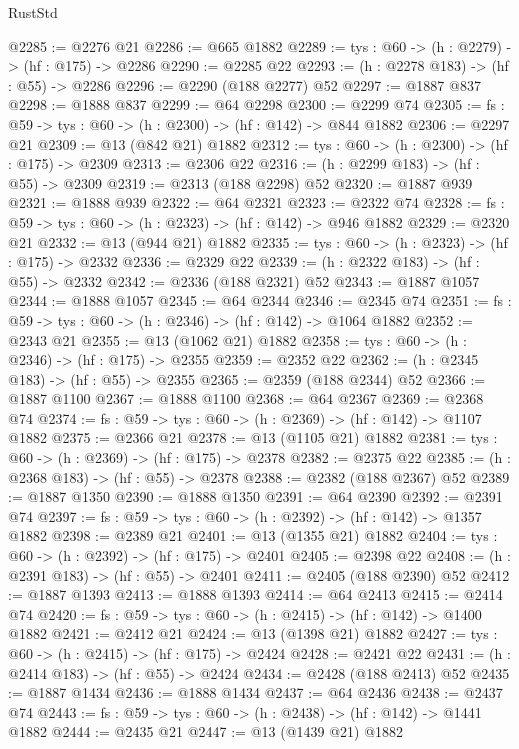 \begin{lexlean}{RustStd}
\begin{coremodule}
@2285 := @2276 @21
@2286 := @665 @1882
@2289 := {tys : @60} -> (h : @2279) -> (hf : @175) -> @2286
@2290 := @2285 @22
@2293 := (h : @2278 @183) -> (hf : @55) -> @2286
@2296 := @2290 (@188 @2277) @52
@2297 := @1887 @837
@2298 := @1888 @837
@2299 := @64 @2298
@2300 := @2299 @74
@2305 := {fs : @59} -> {tys : @60} -> (h : @2300) -> (hf : @142) -> @844 @1882
@2306 := @2297 @21
@2309 := @13 (@842 @21) @1882
@2312 := {tys : @60} -> (h : @2300) -> (hf : @175) -> @2309
@2313 := @2306 @22
@2316 := (h : @2299 @183) -> (hf : @55) -> @2309
@2319 := @2313 (@188 @2298) @52
@2320 := @1887 @939
@2321 := @1888 @939
@2322 := @64 @2321
@2323 := @2322 @74
@2328 := {fs : @59} -> {tys : @60} -> (h : @2323) -> (hf : @142) -> @946 @1882
@2329 := @2320 @21
@2332 := @13 (@944 @21) @1882
@2335 := {tys : @60} -> (h : @2323) -> (hf : @175) -> @2332
@2336 := @2329 @22
@2339 := (h : @2322 @183) -> (hf : @55) -> @2332
@2342 := @2336 (@188 @2321) @52
@2343 := @1887 @1057
@2344 := @1888 @1057
@2345 := @64 @2344
@2346 := @2345 @74
@2351 := {fs : @59} -> {tys : @60} -> (h : @2346) -> (hf : @142) -> @1064 @1882
@2352 := @2343 @21
@2355 := @13 (@1062 @21) @1882
@2358 := {tys : @60} -> (h : @2346) -> (hf : @175) -> @2355
@2359 := @2352 @22
@2362 := (h : @2345 @183) -> (hf : @55) -> @2355
@2365 := @2359 (@188 @2344) @52
@2366 := @1887 @1100
@2367 := @1888 @1100
@2368 := @64 @2367
@2369 := @2368 @74
@2374 := {fs : @59} -> {tys : @60} -> (h : @2369) -> (hf : @142) -> @1107 @1882
@2375 := @2366 @21
@2378 := @13 (@1105 @21) @1882
@2381 := {tys : @60} -> (h : @2369) -> (hf : @175) -> @2378
@2382 := @2375 @22
@2385 := (h : @2368 @183) -> (hf : @55) -> @2378
@2388 := @2382 (@188 @2367) @52
@2389 := @1887 @1350
@2390 := @1888 @1350
@2391 := @64 @2390
@2392 := @2391 @74
@2397 := {fs : @59} -> {tys : @60} -> (h : @2392) -> (hf : @142) -> @1357 @1882
@2398 := @2389 @21
@2401 := @13 (@1355 @21) @1882
@2404 := {tys : @60} -> (h : @2392) -> (hf : @175) -> @2401
@2405 := @2398 @22
@2408 := (h : @2391 @183) -> (hf : @55) -> @2401
@2411 := @2405 (@188 @2390) @52
@2412 := @1887 @1393
@2413 := @1888 @1393
@2414 := @64 @2413
@2415 := @2414 @74
@2420 := {fs : @59} -> {tys : @60} -> (h : @2415) -> (hf : @142) -> @1400 @1882
@2421 := @2412 @21
@2424 := @13 (@1398 @21) @1882
@2427 := {tys : @60} -> (h : @2415) -> (hf : @175) -> @2424
@2428 := @2421 @22
@2431 := (h : @2414 @183) -> (hf : @55) -> @2424
@2434 := @2428 (@188 @2413) @52
@2435 := @1887 @1434
@2436 := @1888 @1434
@2437 := @64 @2436
@2438 := @2437 @74
@2443 := {fs : @59} -> {tys : @60} -> (h : @2438) -> (hf : @142) -> @1441 @1882
@2444 := @2435 @21
@2447 := @13 (@1439 @21) @1882

\end{coremodule}
\end{lexlean}
